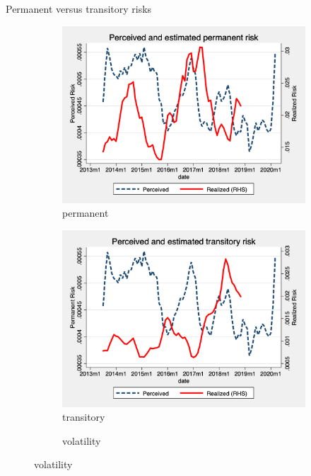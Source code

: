\documentclass{beamer}
\begin{document}
\begin{frame}{Permanent versus transitory risks}
	\label{monthly_decomposition_compare}
	\begin{figure}[ht]
		\centering
		\begin{subfigure}[b]{0.32\textwidth}
			\caption{permanent}
			\includegraphics[width=\textwidth]{figures/real_permanent_compare.png}
		\end{subfigure}
		\begin{subfigure}[b]{0.32\textwidth}
			\caption{transitory}
			\includegraphics[width=\textwidth]{figures/real_transitory_compare.png}
		\end{subfigure} 
		\begin{subfigure}[b]{0.32\textwidth}
		\caption{volatility}

\end{subfigure}
\end{figure}
\end{frame}
\end{document}
